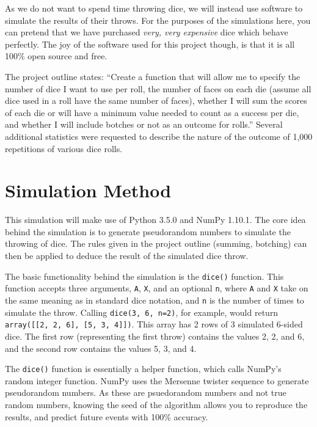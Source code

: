 \documentclass[twocolumn,letterpaper]{article}  %
\begin{document}
As we do not want to spend time throwing dice, we will instead use software to simulate the results of their throws. For the purposes of the simulations here, you can pretend that we have purchased \textit{very, very expensive} dice which behave perfectly. The joy of the software used for this project though, is that it is all 100\% open source and free.

The project outline states: ``Create a function that will allow me to specify the number of dice I want to use per roll, the number of faces on each die (assume all dice used in a roll have the same number of faces), whether I will sum the scores of each die or will have a minimum value needed to count as a success per die, and whether I will include botches or not as an outcome for rolls.'' Several additional statistics were requested to describe the nature of the outcome of 1,000 repetitions of various dice rolls.

\section{Simulation Method}

This simulation will make use of Python 3.5.0 and NumPy 1.10.1. The core idea behind the simulation is to generate pseudorandom numbers to simulate the throwing of dice. The rules given in the project outline (summing, botching) can then be applied to deduce the result of the simulated dice throw.

The basic functionality behind the simulation is the \texttt{dice()} function. This function accepts three arguments, \texttt{A}, \texttt{X}, and an optional \texttt{n}, where \texttt{A} and \texttt{X} take on the same meaning as in standard dice notation, and \texttt{n} is the number of times to simulate the throw. Calling \texttt{dice(3, 6, n=2)}, for example, would return \texttt{array([[2, 2, 6], [5, 3, 4]])}. This array has 2 rows of 3 simulated 6-sided dice. The first row (representing the first throw) contains the values 2, 2, and 6, and the second row contains the values 5, 3, and 4.

The \texttt{dice()} function is essentially a helper function, which calls NumPy's random integer function. NumPy uses the Mersenne twister sequence to generate pseudorandom numbers. As these are psuedorandom numbers and not true random numbers, knowing the seed of the algorithm allows you to reproduce the results, and predict future events with 100\% accuracy.
\end{document}
